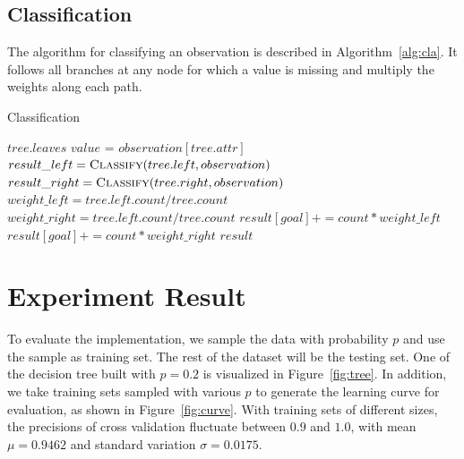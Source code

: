 \documentclass{article}
\begin{document}
\subsection{Classification}

The algorithm for classifying an observation is described in Algorithm~\ref{alg:cla}. It follows all branches at any node for which a value is missing and multiply the weights along each path.

\begin{algorithm}[H]
\centering
\caption{Classification}
\label{alg:cla}
  \begin{algorithmic}[1]
    		\State\Return $tree.leaves$
    	\EndIf
    	\State $value$ = $observation[tree.attr]$
    		\State $result\_left =  \Call{Classify}{tree.left, observation}$
    		\State $result\_right =  \Call{Classify}{tree.right, observation}$
    		\State $weight\_left = tree.left.count/tree.count$
    		\State $weight\_right = tree.left.count/tree.count$
    			\State$result[goal] += count * weight\_left$
    		\EndFor
    			\State$result[goal] += count * weight\_right$
    		\EndFor
    		\State \Return $result$
    	\Else
    			\State \Return {}
    		\Else
    			\State \Return {}
    		\EndIf
    	\EndIf
    \EndFunction
  \end{algorithmic}
\end{algorithm}

\section{Experiment Result}

To evaluate the implementation, we sample the data with probability $p$ and use the sample as training set. The rest of the dataset will be the testing set. One of the decision tree built with $p = 0.2$ is visualized in Figure~\ref{fig:tree}. In addition, we take training sets sampled with various $p$ to generate the learning curve for evaluation, as shown in Figure~\ref{fig:curve}. With training sets of different sizes, the precisions of cross validation fluctuate between $0.9$ and $1.0$, with mean $\mu = 0.9462$ and standard variation $\sigma = 0.0175$.
\end{document}
